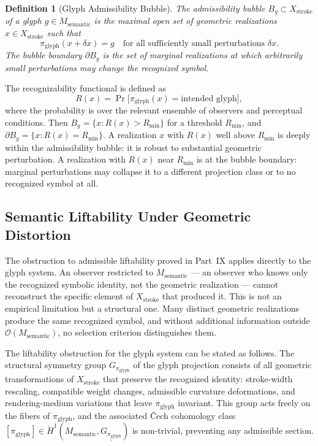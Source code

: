 \documentclass[12pt, a4paper]{article}
\theoremstyle{essaystyle}
\newtheorem{definition}{Definition}
\begin{document}
\begin{definition}[Glyph Admissibility Bubble]
The \emph{admissibility bubble} $B_g \subset X_{\mathrm{stroke}}$ of a glyph
$g \in M_{\mathrm{semantic}}$ is the maximal open set of geometric realizations
$x \in X_{\mathrm{stroke}}$ such that
\[
\pi_{\mathrm{glyph}}(x + \delta x) = g
\quad \text{for all sufficiently small perturbations } \delta x.
\]
The \emph{bubble boundary} $\partial B_g$ is the set of marginal realizations at which
arbitrarily small perturbations may change the recognized symbol.
\end{definition}

The recognizability functional is defined as
\[
R(x) = \Pr\bigl[\pi_{\mathrm{glyph}}(x) = \text{intended glyph}\bigr],
\]
where the probability is over the relevant ensemble of observers and perceptual
conditions. Then $B_g = \{x : R(x) > R_{\min}\}$ for a threshold $R_{\min}$, and
$\partial B_g = \{x : R(x) = R_{\min}\}$. A realization $x$ with $R(x)$ well above
$R_{\min}$ is deeply within the admissibility bubble: it is robust to substantial
geometric perturbation. A realization with $R(x)$ near $R_{\min}$ is at the bubble
boundary: marginal perturbations may collapse it to a different projection class or
to no recognized symbol at all.

\subsection{Semantic Liftability Under Geometric Distortion}

The obstruction to admissible liftability proved in Part~IX applies directly to the
glyph system. An observer restricted to $M_{\mathrm{semantic}}$ --- an observer who
knows only the recognized symbolic identity, not the geometric realization --- cannot
reconstruct the specific element of $X_{\mathrm{stroke}}$ that produced it. This
is not an empirical limitation but a structural one. Many distinct geometric realizations
produce the same recognized symbol, and without additional information outside
$\mathcal{O}(M_{\mathrm{semantic}})$, no selection criterion distinguishes them.

The liftability obstruction for the glyph system can be stated as follows. The
structural symmetry group $G_{\pi_{\mathrm{glyph}}}$ of the glyph projection consists
of all geometric transformations of $X_{\mathrm{stroke}}$ that preserve the recognized
identity: stroke-width rescaling, compatible weight changes, admissible curvature
deformations, and rendering-medium variations that leave $\pi_{\mathrm{glyph}}$
invariant. This group acts freely on the fibers of $\pi_{\mathrm{glyph}}$, and the
associated Čech cohomology class $[\pi_{\mathrm{glyph}}] \in \check{H}^1(M_{\mathrm{semantic}},
\underline{G_{\pi_{\mathrm{glyph}}}})$ is non-trivial, preventing any admissible section.
\end{document}
